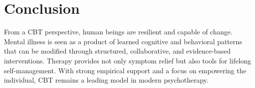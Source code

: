\documentclass[stu]{apa7}
\begin{document}
\section{Conclusion}

From a CBT perspective, human beings are resilient and capable of change. Mental illness is seen as a product of learned cognitive and behavioral patterns that can be modified through structured, collaborative, and evidence-based interventions. Therapy provides not only symptom relief but also tools for lifelong self-management. With strong empirical support and a focus on empowering the individual, CBT remains a leading model in modern psychotherapy.

\printbibliography
\end{document}
